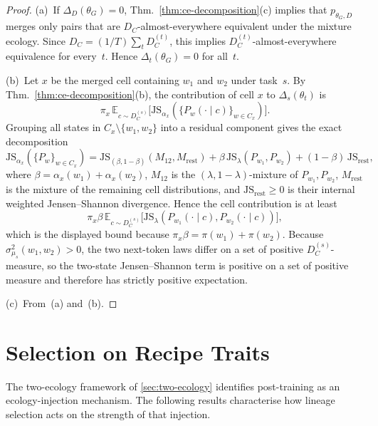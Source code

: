 \documentclass[twoside,11pt]{article}
\newcommand{\sigmasq}{\sigma^2}
\newcommand{\E}{\mathbb{E}}
\newcommand{\JS}{\mathrm{JS}}
\newcommand{\thmref}[1]{Thm.~\ref{#1}}
\begin{document}
\begin{proof}
(a)~If $\Delta_D(\theta_G)=0$, \thmref{thm:ce-decomposition}(c) implies that $p_{\theta_G,D}$ merges only pairs that are $D_C$-almost-everywhere equivalent under the mixture ecology. Since $D_C=(1/T)\sum_t D_C^{(t)}$, this implies $D_C^{(t)}$-almost-everywhere equivalence for every~$t$. Hence $\Delta_t(\theta_G)=0$ for all~$t$.

(b)~Let $x$ be the merged cell containing $w_1$ and $w_2$ under task~$s$. By \thmref{thm:ce-decomposition}(b), the contribution of cell $x$ to $\Delta_s(\theta_t)$ is
\[
\pi_x\, \E_{c\sim D_C^{(s)}}
\bigl[\JS_{\alpha_x}
(\{P_w(\cdot\mid c)\}_{w\in C_x})\bigr].
\]
Grouping all states in $C_x \setminus \{w_1,w_2\}$ into a residual component gives the exact decomposition
\[
\JS_{\alpha_x}(\{P_w\}_{w\in C_x})
= \JS_{(\beta,1-\beta)}(M_{12},M_{\mathrm{rest}})
  + \beta\,\JS_{\lambda}(P_{w_1},P_{w_2})
  + (1-\beta)\,\JS_{\mathrm{rest}},
\]
where $\beta=\alpha_x(w_1)+\alpha_x(w_2)$, $M_{12}$ is the $(\lambda,1-\lambda)$-mixture of $P_{w_1},P_{w_2}$, $M_{\mathrm{rest}}$ is the mixture of the remaining cell distributions, and $\JS_{\mathrm{rest}}\ge 0$ is their internal weighted Jensen--Shannon divergence. Hence the cell contribution is at least
\[
\pi_x\beta\,\E_{c\sim D_C^{(s)}}\bigl[\JS_{\lambda}(P_{w_1}(\cdot\mid c),P_{w_2}(\cdot\mid c))\bigr],
\]
which is the displayed bound because $\pi_x\beta=\pi(w_1)+\pi(w_2)$. Because $\sigmasq_{\mu_s}(w_1,w_2)>0$, the two next-token laws differ on a set of positive $D_C^{(s)}$-measure, so the two-state Jensen--Shannon term is positive on a set of positive measure and therefore has strictly positive expectation.

(c)~From~(a) and~(b).
\end{proof}

\section{Selection on Recipe Traits}\label{app:recipe}

The two-ecology framework of \cref{sec:two-ecology} identifies post-training as an ecology-injection mechanism. The following results characterise how lineage selection acts on the strength of that injection.
\end{document}
